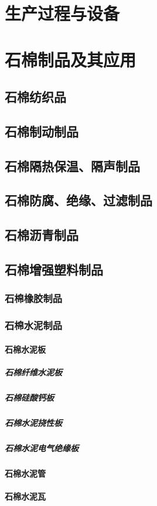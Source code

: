 \documentclass[UTF8]{../../ApplicationUniverse}
\begin{document}
\section{生产过程与设备}
\section{石棉制品及其应用}
    \subsection{石棉纺织品}
    \subsection{石棉制动制品}
    \subsection{石棉隔热保温、隔声制品}
    \subsection{石棉防腐、绝缘、过滤制品}
    \subsection{石棉沥青制品}
    \subsection{石棉增强塑料制品}
        \subsubsection{石棉橡胶制品}
        \subsubsection{石棉水泥制品}
            \paragraph{石棉水泥板}
                \subparagraph{石棉纤维水泥板}
                \subparagraph{石棉硅酸钙板}
                \subparagraph{石棉水泥挠性板}
                \subparagraph{石棉水泥电气绝缘板}
            \paragraph{石棉水泥管}
            \paragraph{石棉水泥瓦}
\end{document}

